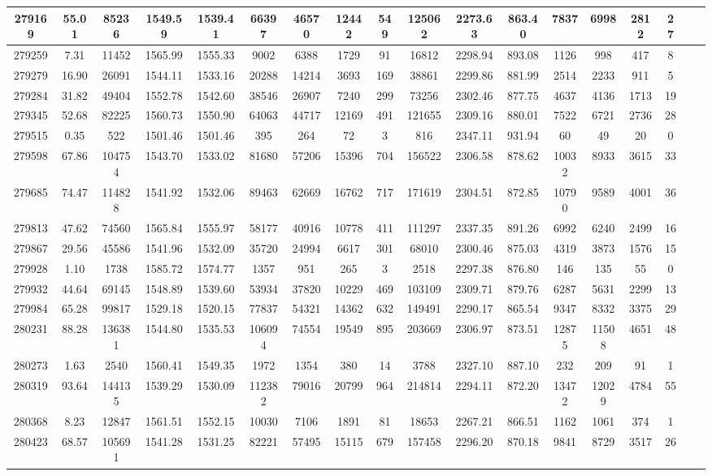 \documentclass[10pt]{extarticle}
\begin{document}
\begin{longtable}{|c|c|c|c|c|c|c|c|c|c|c|c|c|c|c|c|c|c|}
\hline 
279169&55.01&85236&1549.59&1539.41&66397&46570&12442&549&125062&2273.63&863.40&7837&6998&2812&27 \\ 
\hline 
279259&7.31&11452&1565.99&1555.33&9002&6388&1729&91&16812&2298.94&893.08&1126&998&417&8 \\ 
\hline 
279279&16.90&26091&1544.11&1533.16&20288&14214&3693&169&38861&2299.86&881.99&2514&2233&911&5 \\ 
\hline 
279284&31.82&49404&1552.78&1542.60&38546&26907&7240&299&73256&2302.46&877.75&4637&4136&1713&19 \\ 
\hline 
279345&52.68&82225&1560.73&1550.90&64063&44717&12169&491&121655&2309.16&880.01&7522&6721&2736&28 \\ 
\hline 
279515&0.35&522&1501.46&1501.46&395&264&72&3&816&2347.11&931.94&60&49&20&0 \\ 
\hline 
279598&67.86&104754&1543.70&1533.02&81680&57206&15396&704&156522&2306.58&878.62&10032&8933&3615&33 \\ 
\hline 
279685&74.47&114828&1541.92&1532.06&89463&62669&16762&717&171619&2304.51&872.85&10790&9589&4001&36 \\ 
\hline 
279813&47.62&74560&1565.84&1555.97&58177&40916&10778&411&111297&2337.35&891.26&6992&6240&2499&16 \\ 
\hline 
279867&29.56&45586&1541.96&1532.09&35720&24994&6617&301&68010&2300.46&875.03&4319&3873&1576&15 \\ 
\hline 
279928&1.10&1738&1585.72&1574.77&1357&951&265&3&2518&2297.38&876.80&146&135&55&0 \\ 
\hline 
279932&44.64&69145&1548.89&1539.60&53934&37820&10229&469&103109&2309.71&879.76&6287&5631&2299&13 \\ 
\hline 
279984&65.28&99817&1529.18&1520.15&77837&54321&14362&632&149491&2290.17&865.54&9347&8332&3375&29 \\ 
\hline 
280231&88.28&136381&1544.80&1535.53&106094&74554&19549&895&203669&2306.97&873.51&12875&11508&4651&48 \\ 
\hline 
280273&1.63&2540&1560.41&1549.35&1972&1354&380&14&3788&2327.10&887.10&232&209&91&1 \\ 
\hline 
280319&93.64&144135&1539.29&1530.09&112382&79016&20799&964&214814&2294.11&872.20&13472&12029&4784&55 \\ 
\hline 
280368&8.23&12847&1561.51&1552.15&10030&7106&1891&81&18653&2267.21&866.51&1162&1061&374&1 \\ 
\hline 
280423&68.57&105691&1541.28&1531.25&82221&57495&15115&679&157458&2296.20&870.18&9841&8729&3517&26 \\ 

\end{longtable}
\end{document}
